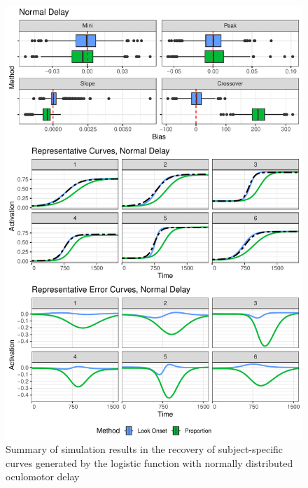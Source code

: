 \documentclass{article}
\begin{document}
\begin{figure}[H]
\centering
\includegraphics{rep_and_diff_normal_delay.pdf}
\caption{Summary of simulation results in the recovery of subject-specific curves generated by the logistic function with normally distributed oculomotor delay}
\label{fig:panel_normal_delay}
\end{figure}
\end{document}
